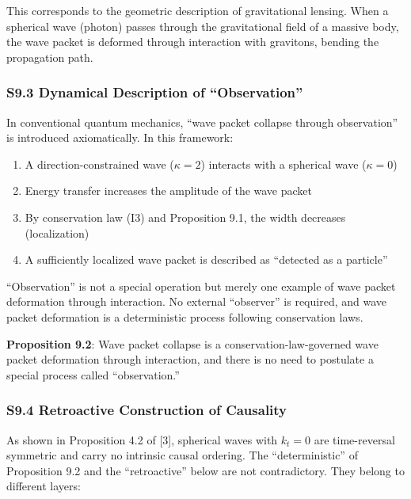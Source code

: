 \documentclass[
  a4paper,11pt]{article}
\providecommand{\tightlist}{%
  \setlength{\itemsep}{0pt}\setlength{\parskip}{0pt}}
\theoremstyle{definition}
\theoremstyle{remark}
\begin{document}
This corresponds to the geometric description of gravitational lensing.
When a spherical wave (photon) passes through the gravitational field of
a massive body, the wave packet is deformed through interaction with
gravitons, bending the propagation path.

\subsubsection{S9.3 Dynamical Description of
``Observation''}\label{s9.3-dynamical-description-of-observation}

In conventional quantum mechanics, ``wave packet collapse through
observation'' is introduced axiomatically. In this framework:

\begin{enumerate}
\def\labelenumi{\arabic{enumi}.}
\tightlist
\item
  A direction-constrained wave (\(\kappa = 2\)) interacts with a
  spherical wave (\(\kappa = 0\))
\item
  Energy transfer increases the amplitude of the wave packet
\item
  By conservation law (I3) and Proposition 9.1, the width decreases
  (localization)
\item
  A sufficiently localized wave packet is described as ``detected as a
  particle''
\end{enumerate}

``Observation'' is not a special operation but merely one example of
wave packet deformation through interaction. No external ``observer'' is
required, and wave packet deformation is a deterministic process
following conservation laws.

\textbf{Proposition 9.2}: Wave packet collapse is a
conservation-law-governed wave packet deformation through interaction,
and there is no need to postulate a special process called
``observation.''

\subsubsection{S9.4 Retroactive Construction of
Causality}\label{s9.4-retroactive-construction-of-causality}

As shown in Proposition 4.2 of {[}3{]}, spherical waves with \(k_t = 0\)
are time-reversal symmetric and carry no intrinsic causal ordering. The
``deterministic'' of Proposition 9.2 and the ``retroactive'' below are
not contradictory. They belong to different layers:
\end{document}
